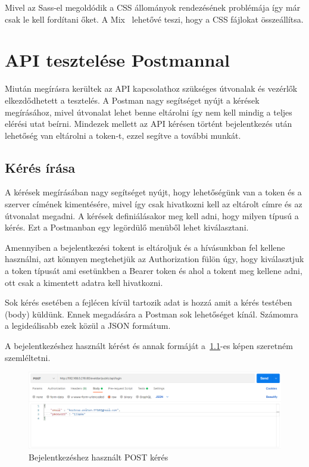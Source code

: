 \documentclass[
]{thesis-ekf}
\theoremstyle{definition}
\theoremstyle{remark}
\begin{document}
	Mivel az Sass-el megoldódik a CSS állományok rendezésének problémája így már csak le kell fordítani őket. A Mix~\cite{laravel_mix} lehetővé teszi, hogy a CSS fájlokat összeállítsa.  
	
	\chapter{API tesztelése Postmannal}
	Miután megírásra kerültek az API kapcsolathoz szükséges útvonalak és vezérlők elkezdődhetett a tesztelés. A Postman nagy segítséget nyújt a kérések megírásához, mivel útvonalat lehet benne eltárolni így nem kell mindig a teljes elérési utat beírni. Mindezek mellett az API kérésen történt bejelentkezés után lehetőség van eltárolni a token-t, ezzel segítve a további munkát. 
	
	\section{Kérés írása}
	A kérések megírásában nagy segítséget nyújt, hogy lehetőségünk van a token és a szerver címének kimentésére, mivel így csak hivatkozni kell az eltárolt címre és az útvonalat megadni. A kérések definiálásakor meg kell adni, hogy milyen típusú a kérés. Ezt a Postmanban egy legördülő menüből lehet kiválasztani. 
	
	Amennyiben a bejelentkezési tokent is eltároljuk és a hívásunkban fel kellene használni, azt könnyen megtehetjük az Authorization fülön úgy, hogy kiválasztjuk a token típusát ami esetünkben a Bearer token és ahol a tokent meg kellene adni, ott csak a kimentett adatra kell hivatkozni. 
	
	Sok kérés esetében a fejlécen kívül tartozik adat is hozzá amit a kérés testében (body) küldünk. Ennek megadására a Postman sok lehetőséget kínál. Számomra a legideálisabb ezek közül a JSON formátum. 
	
	A bejelentkezéshez használt kérést és annak formáját a~\ref{figure:postman_login}-es képen szeretném szemléltetni. 
	
	\begin{figure}[ht!]
		\centering
		\includegraphics[width=1\textwidth]{postman/login_post}
		\caption{Bejelentkezéshez használt POST kérés}
		\label{figure:postman_login}
	\end{figure}
	
\end{document}

